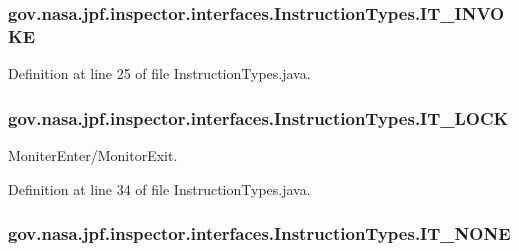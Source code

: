 \subsubsection[{\texorpdfstring{I\+T\+\_\+\+I\+N\+V\+O\+KE}{IT_INVOKE}}]{\setlength{\rightskip}{0pt plus 5cm}gov.\+nasa.\+jpf.\+inspector.\+interfaces.\+Instruction\+Types.\+I\+T\+\_\+\+I\+N\+V\+O\+KE}\hypertarget{enumgov_1_1nasa_1_1jpf_1_1inspector_1_1interfaces_1_1_instruction_types_a5b4f945866dcdd7e7548ce02f07006da}{}\label{enumgov_1_1nasa_1_1jpf_1_1inspector_1_1interfaces_1_1_instruction_types_a5b4f945866dcdd7e7548ce02f07006da}


Definition at line 25 of file Instruction\+Types.\+java.

\subsubsection[{\texorpdfstring{I\+T\+\_\+\+L\+O\+CK}{IT_LOCK}}]{\setlength{\rightskip}{0pt plus 5cm}gov.\+nasa.\+jpf.\+inspector.\+interfaces.\+Instruction\+Types.\+I\+T\+\_\+\+L\+O\+CK}\hypertarget{enumgov_1_1nasa_1_1jpf_1_1inspector_1_1interfaces_1_1_instruction_types_a5bb2a0156a6c9ba0e8aebfb6938585b8}{}\label{enumgov_1_1nasa_1_1jpf_1_1inspector_1_1interfaces_1_1_instruction_types_a5bb2a0156a6c9ba0e8aebfb6938585b8}


Moniter\+Enter/\+Monitor\+Exit. 



Definition at line 34 of file Instruction\+Types.\+java.

\subsubsection[{\texorpdfstring{I\+T\+\_\+\+N\+O\+NE}{IT_NONE}}]{\setlength{\rightskip}{0pt plus 5cm}gov.\+nasa.\+jpf.\+inspector.\+interfaces.\+Instruction\+Types.\+I\+T\+\_\+\+N\+O\+NE}\hypertarget{enumgov_1_1nasa_1_1jpf_1_1inspector_1_1interfaces_1_1_instruction_types_abf9c9b21c4c2e4711034843f22ce87b1}{}\label{enumgov_1_1nasa_1_1jpf_1_1inspector_1_1interfaces_1_1_instruction_types_abf9c9b21c4c2e4711034843f22ce87b1}


